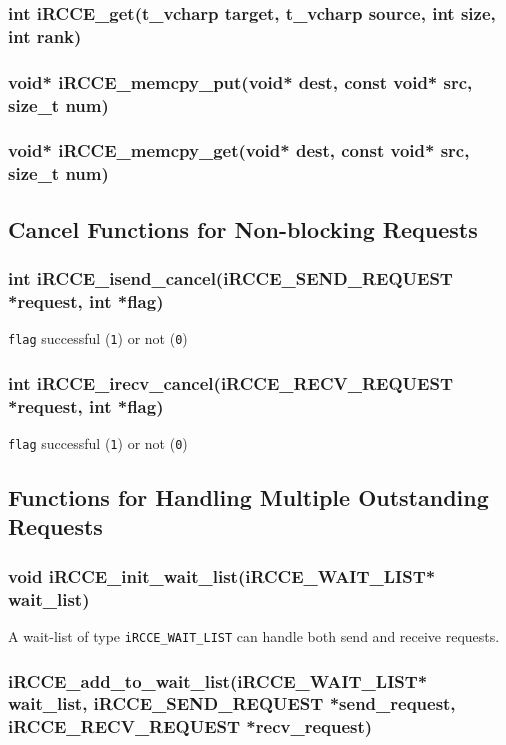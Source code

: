 \documentclass[fontsize=10pt, paper=a4, DIV12, pagesize=auto]{scrartcl}
\begin{document}
\subsubsection{int iRCCE\_get(t\_vcharp target, t\_vcharp source, int size, int rank)}\vspace{-0.3cm}
\subsubsection{void* iRCCE\_memcpy\_put(void* dest, const void* src, size\_t num)}\vspace{-0.3cm}
\subsubsection{void* iRCCE\_memcpy\_get(void* dest, const void* src, size\_t num)}\vspace{-0.3cm}
\subsection{Cancel Functions for Non-blocking Requests}
\subsubsection{int iRCCE\_isend\_cancel(iRCCE\_SEND\_REQUEST *request, int *flag)}\vspace{-0.3cm}
\texttt{flag} successful (\texttt{1}) or not (\texttt{0})
\subsubsection{int iRCCE\_irecv\_cancel(iRCCE\_RECV\_REQUEST *request, int *flag)}\vspace{-0.3cm}
\texttt{flag} successful (\texttt{1}) or not (\texttt{0})
\subsection{Functions for Handling Multiple Outstanding Requests}
\subsubsection{void iRCCE\_init\_wait\_list(iRCCE\_WAIT\_LIST* wait\_list)}\vspace{-0.3cm}
A wait-list of type \texttt{iRCCE\_WAIT\_LIST} can handle both send and receive requests.
\subsubsection{iRCCE\_add\_to\_wait\_list(iRCCE\_WAIT\_LIST* wait\_list, iRCCE\_SEND\_REQUEST *send\_request, \\ 
\hspace{8.63cm} iRCCE\_RECV\_REQUEST *recv\_request)}\vspace{-0.3cm}
\end{document}

